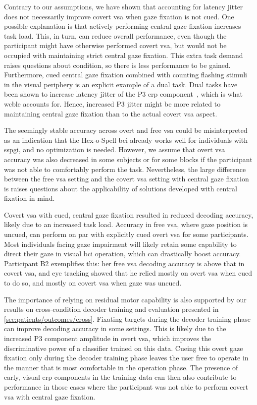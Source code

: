 \documentclass{article}
\begin{document}
Contrary to our assumptions, we have shown that accounting for latency jitter does not
necessarily improve covert \ac{vsa} when gaze fixation is not cued.
One possible explanation is that actively performing central gaze fixation
increases task load.
This, in turn, can reduce overall performance, even though the participant might
have otherwise performed covert \ac{vsa}, but would not be occupied with
maintaining strict central gaze fixation.
This extra task demand raises questions about condition, so
there is less performance to be gained.
Furthermore, cued central gaze fixation combined with counting flashing stimuli
in the visual periphery is an explicit example of a dual task.
Dual tasks have been shown to increase latency
jitter of the P3 \ac{erp} component~\cite{Polich2007,Arico2014, VanDenKerchove2024},
which is what \ac{wcble} accounts for.
Hence, increased P3 jitter might be more related to maintaining central gaze fixation
than to the actual covert \ac{vsa} aspect.

The seemingly stable accuracy across overt and free \ac{vsa} could be
misinterpreted as an indication that the Hex-o-Spell \ac{bci} already works
well for individuals with \ac{sspgi}, and no optimization is
needed.
However, we assume that overt \ac{vsa} accuracy was also decreased in some
subjects or for some blocks if the participant was not able to comfortably
perform the task.
Nevertheless, the large difference between the free \ac{vsa} setting and the
covert \ac{vsa} setting
with central gaze fixation is raises questions about the applicability of
solutions developed with central fixation in mind.

Covert \ac{vsa} with cued, central gaze fixation resulted in reduced decoding
accuracy, likely due to an increased task load.
Accuracy in free \ac{vsa}, where gaze position is uncued, can perform on par with
explicitly cued overt \ac{vsa} for some participants.
Most individuals facing gaze impairment will likely retain
some capability to direct their gaze in visual \ac{bci} operation, which can
drastically boost accuracy.
Participant B2 exemplifies this: her free \ac{vsa} decoding accuracy is above that in covert
\ac{vsa}, and eye tracking showed that he relied mostly
on overt \ac{vsa} when cued to do so, and mostly on covert \ac{vsa} when
gaze was uncued.

The importance of relying on residual motor capability is also supported by our
results on cross-condition decoder training and
evaluation presented
in \cref{sec:patients/outcomes/cross}.
Fixating
targets during the decoder training phase can improve
decoding accuracy in some settings.
This is likely due to the increased P3 component amplitude in overt \ac{vsa},
which improves the discriminative power of a classifier trained on this data.
Cueing this overt gaze fixation only during the decoder training phase leaves the user
free to operate in the manner that is most comfortable in the
operation phase.
The presence of early, visual \ac{erp} components in the training data can then
also contribute to performance in those cases where the participant was not able
to perform covert \ac{vsa} with central gaze fixation.
\end{document}
